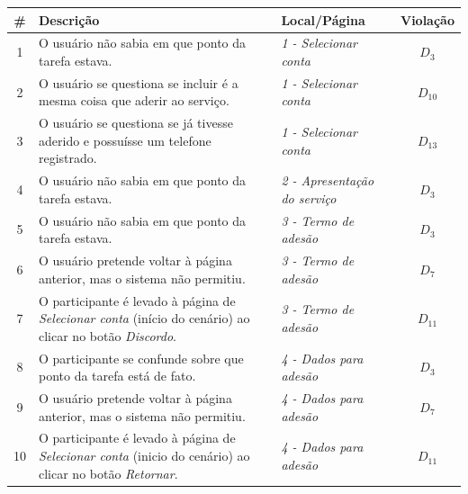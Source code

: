 \begin{table}[!htb]
  \small
  \begin{center}
    \begin{tabular}{|c|m{76mm}|m{48mm}|c|} \hline

      {\bf \#} & {\bf Descrição} & {\bf Local/Página} & {\bf Violação}
      \\ \hline

      1 & O usuário não sabia em que ponto da tarefa estava.  & {\em 1
        - Selecionar conta} & $D_{3}$ \\ \hline

      2 & O usuário se questiona se incluir é a mesma coisa que aderir
      ao serviço.  & {\em 1 - Selecionar conta} & $D_{10}$ \\ \hline

      3 & O usuário se questiona  se já tivesse aderido e possuísse um
      telefone registrado.   & {\em 1  - Selecionar conta}  & $D_{13}$
      \\ \hline

      4 & O usuário não sabia em  que ponto da tarefa estava. & {\em 2
        - Apresentação do serviço} & $D_{3}$ \\ \hline

      5 & O usuário não sabia em que ponto da tarefa estava.  & {\em 3
        - Termo de adesão} & $D_{3}$ \\ \hline

      6 & O  usuário pretende voltar à página  anterior, mas o sistema
      não permitiu.  & {\em 3 - Termo de adesão} & $D_{7}$ \\ \hline

      7 & O  participante é levado à página  de {\em Selecionar conta}
      (início do cenário) ao clicar  no botão {\em Discordo}. & {\em 3
        - Termo de adesão} & $D_{11}$ \\ \hline

      8 & O participante se confunde sobre que ponto da tarefa está de
      fato. & {\em 4 - Dados para adesão} & $D_{3}$ \\ \hline

      9 & O  usuário pretende voltar à página  anterior, mas o sistema
      não permitiu.  & {\em 4 - Dados para adesão} & $D_{7}$ \\ \hline

      10 & O participante é  levado à página de {\em Selecionar conta}
      (inicio do cenário) ao clicar no botão {\em Retornar}.  & {\em 4
        - Dados para adesão} & $D_{11}$ \\ \hline


\end{tabular}
\end{center}
\end{table}
